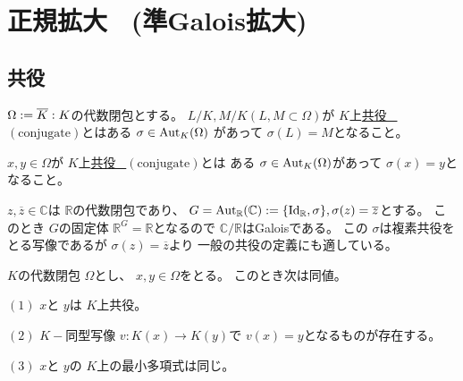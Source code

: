 \documentclass[../master_galois_theory]{subfiles}
\begin{document}
\setcounter{section}{10}

\section{正規拡大 \  (準Galois拡大)}

\subsection{共役}

\begin{defi}
  $\Omega := \overline{K} : K$の代数閉包とする。
  $L/K , M/K (L , M \subset \Omega)$が $K$上\underline{共役 \  $(\mathrm{conjugate})$}とはある $\sigma \in \mathrm{Aut}_K(\Omega)$
  があって $\sigma (L) = M$となること。

  $x , y \in \Omega$が $K$上\underline{共役 \  $(\mathrm{conjugate})$}とは
  ある $\sigma \in \mathrm{Aut}_K(\Omega)$があって $\sigma(x) = y$となること。
\end{defi}

\begin{exam}
  $z , \overline{z} \in \mathbb{C}$は $\mathbb{R}$の代数閉包であり、
  $G = \mathrm{Aut}_{\mathbb{R}}(\mathbb{C}) := \{ \mathrm{Id}_{\mathbb{R}} , \sigma \} , \sigma(z) = \overline{z}$とする。
  このとき $G$の固定体 $\mathbb{R}^G = \mathbb{R}$となるので $\mathbb{C}/\mathbb{R}$は\rm{Galois}である。
  この $\sigma$は複素共役をとる写像であるが $\sigma(z) = \overline{z}$より
  一般の共役の定義にも適している。
\end{exam}

\begin{prop} \label{prop:conjugate}
  $K$の代数閉包 $\Omega$とし、
  $x , y \in \Omega$をとる。
  このとき次は同値。

  $(1)$
  $x$と $y$は $K$上共役。

  $(2)$
  $K-$同型写像 $v : K(x) \longrightarrow K(y)$で
  $v(x) = y$となるものが存在する。

  $(3)$
  $x$と $y$の $K$上の最小多項式は同じ。
\end{prop}
\end{document}
